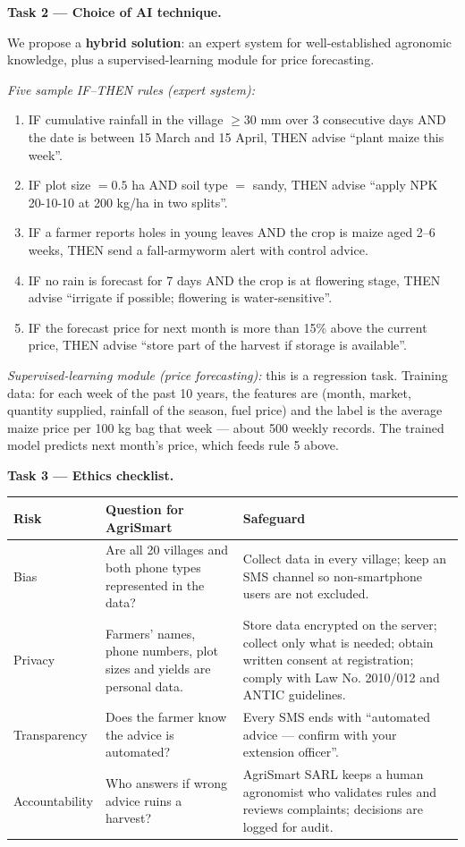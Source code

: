 \documentclass[11pt]{article}
\newcommand{\cle}[1]{{\popxbold\color{popdark}#1}}
\begin{document}
\textbf{Task 2 — Choice of AI technique.}

We propose a \textbf{hybrid solution}: an expert system for well-established agronomic knowledge, plus a supervised-learning module for price forecasting.

\emph{Five sample IF–THEN rules (expert system):}
\begin{enumerate}
\item IF cumulative rainfall in the village $\geq 30$ mm over 3 consecutive days AND the date is between 15 March and 15 April, THEN advise ``plant maize this week''.
\item IF plot size $= 0.5$ ha AND soil type $=$ sandy, THEN advise ``apply NPK 20-10-10 at 200 kg/ha in two splits''.
\item IF a farmer reports holes in young leaves AND the crop is maize aged 2--6 weeks, THEN send a fall-armyworm alert with control advice.
\item IF no rain is forecast for 7 days AND the crop is at flowering stage, THEN advise ``irrigate if possible; flowering is water-sensitive''.
\item IF the forecast price for next month is more than 15\% above the current price, THEN advise ``store part of the harvest if storage is available''.
\end{enumerate}

\emph{Supervised-learning module (price forecasting):} this is a \cle{regression} task. Training data: for each week of the past 10 years, the features are (month, market, quantity supplied, rainfall of the season, fuel price) and the label is the average maize price per 100 kg bag that week — about 500 weekly records. The trained model predicts next month's price, which feeds rule 5 above.

\textbf{Task 3 — Ethics checklist.}

\begin{center}
\begin{tabular}{|l|p{5.5cm}|p{5.5cm}|}
\hline
\rowcolor{popblueL} \textbf{Risk} & \textbf{Question for AgriSmart} & \textbf{Safeguard} \\
\hline
Bias & Are all 20 villages and both phone types represented in the data? & Collect data in every village; keep an SMS channel so non-smartphone users are not excluded. \\
\hline
Privacy & Farmers' names, phone numbers, plot sizes and yields are personal data. & Store data encrypted on the server; collect only what is needed; obtain written consent at registration; comply with Law No. 2010/012 and ANTIC guidelines. \\
\hline
Transparency & Does the farmer know the advice is automated? & Every SMS ends with ``automated advice — confirm with your extension officer''. \\
\hline
Accountability & Who answers if wrong advice ruins a harvest? & AgriSmart SARL keeps a human agronomist who validates rules and reviews complaints; decisions are logged for audit. \\
\hline
\end{tabular}
\end{center}
\end{document}
